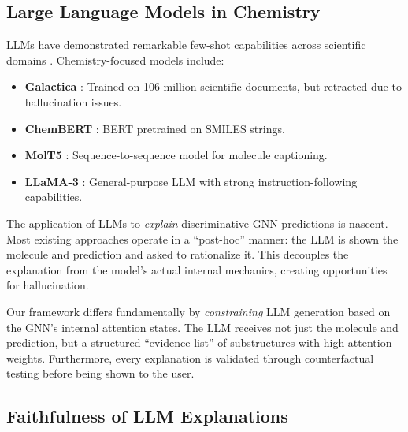 \documentclass[conference]{IEEEtran}
\begin{document}
\subsection{Large Language Models in Chemistry}

LLMs have demonstrated remarkable few-shot capabilities across scientific domains \cite{brown2020language}. Chemistry-focused models include:

\begin{itemize}
    \item \textbf{Galactica} \cite{taylor2022galactica}: Trained on 106 million scientific documents, but retracted due to hallucination issues.
    \item \textbf{ChemBERT} \cite{chithrananda2020chemberta}: BERT pretrained on SMILES strings.
    \item \textbf{MolT5} \cite{edwards2022translation}: Sequence-to-sequence model for molecule captioning.
    \item \textbf{LLaMA-3} \cite{touvron2023llama}: General-purpose LLM with strong instruction-following capabilities.
\end{itemize}

The application of LLMs to \textit{explain} discriminative GNN predictions is nascent. Most existing approaches operate in a ``post-hoc'' manner: the LLM is shown the molecule and prediction and asked to rationalize it. This decouples the explanation from the model's actual internal mechanics, creating opportunities for hallucination.

Our framework differs fundamentally by \textit{constraining} LLM generation based on the GNN's internal attention states. The LLM receives not just the molecule and prediction, but a structured ``evidence list'' of substructures with high attention weights. Furthermore, every explanation is validated through counterfactual testing before being shown to the user.

\subsection{Faithfulness of LLM Explanations}
\end{document}
